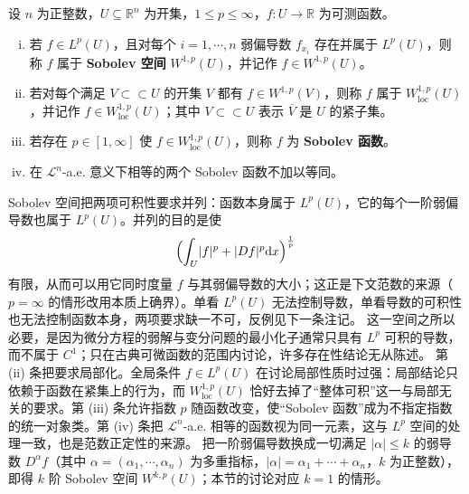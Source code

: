 \documentclass[../../main.tex]{subfiles}%
\begin{document}
\begin{definition}[Sobolev 空间]\label{definition:ch04-4-2}
设 $n$ 为正整数，$U\subseteq\mathbb{R}^{n}$ 为开集，$1\leqslant p\leqslant\infty$，$f:U\to\mathbb{R}$ 为可测函数。
\begin{enumerate}[(i)]
\item 若 $f\in L^{p}(U)$，且对每个 $i=1,\cdots,n$ 弱偏导数 $f_{x_i}$ 存在并属于 $L^{p}(U)$，则称 $f$ 属于 \textbf{Sobolev 空间} $W^{1,p}(U)$，并记作 $f\in W^{1,p}(U)$。
\item 若对每个满足 $V\subset\subset U$ 的开集 $V$ 都有 $f\in W^{1,p}(V)$，则称 $f$ 属于 $W^{1,p}_{\mathrm{loc}}(U)$，并记作 $f\in W^{1,p}_{\mathrm{loc}}(U)$；其中 $V\subset\subset U$ 表示 $\overline{V}$ 是 $U$ 的紧子集。
\item 若存在 $p\in[1,\infty]$ 使 $f\in W^{1,p}_{\mathrm{loc}}(U)$，则称 $f$ 为 \textbf{Sobolev 函数}。
\item 在 $\mathcal{L}^{n}$-a.e. 意义下相等的两个 Sobolev 函数不加以等同。
\end{enumerate}
\end{definition}

\begin{remark}\label{remark:ch04-def-4-2-动机}
Sobolev 空间把两项可积性要求并列：函数本身属于 $L^{p}(U)$，它的每个一阶弱偏导数也属于 $L^{p}(U)$。并列的目的是使
\begin{align*}
\Bigl(\int_{U}\lvert f\rvert^{p}+\lvert Df\rvert^{p}\mathrm{d} x\Bigr)^{\frac{1}{p}}
\end{align*}
有限，从而可以用它同时度量 $f$ 与其弱偏导数的大小；这正是下文范数的来源（$p=\infty$ 的情形改用本质上确界）。单看 $L^{p}(U)$ 无法控制导数，单看导数的可积性也无法控制函数本身，两项要求缺一不可，反例见下一条注记。
这一空间之所以必要，是因为微分方程的弱解与变分问题的最小化子通常只具有 $L^{p}$ 可积的导数，而不属于 $C^{1}$；只在古典可微函数的范围内讨论，许多存在性结论无从陈述。
第 (ii) 条把要求局部化。全局条件 $f\in L^{p}(U)$ 在讨论局部性质时过强：局部结论只依赖于函数在紧集上的行为，而 $W^{1,p}_{\mathrm{loc}}(U)$ 恰好去掉了“整体可积”这一与局部无关的要求。第 (iii) 条允许指数 $p$ 随函数改变，使“Sobolev 函数”成为不指定指数的统一对象类。第 (iv) 条把 $\mathcal{L}^{n}$-a.e. 相等的函数视为同一元素，这与 $L^{p}$ 空间的处理一致，也是范数正定性的来源。
把一阶弱偏导数换成一切满足 $\lvert\alpha\rvert\leqslant k$ 的弱导数 $D^{\alpha}f$（其中 $\alpha=(\alpha_{1},\cdots,\alpha_{n})$ 为多重指标，$\lvert\alpha\rvert=\alpha_{1}+\cdots+\alpha_{n}$，$k$ 为正整数），即得 $k$ 阶 Sobolev 空间 $W^{k,p}(U)$；本节的讨论对应 $k=1$ 的情形。
\end{remark}
\end{document}
